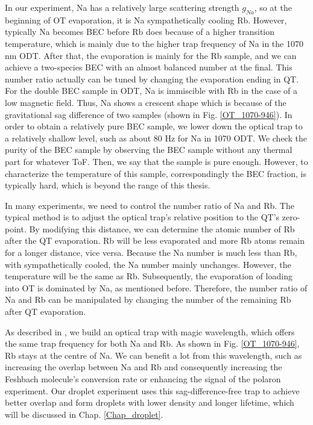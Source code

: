 In our experiment, Na has a relatively large scattering strength $g_{Na}$, so at the beginning of OT evaporation, it is Na sympathetically cooling Rb. However, typically Na becomes BEC before Rb does because of a higher transition temperature, which is mainly due to the higher trap frequency of Na in the 1070 nm ODT. After that, the evaporation is mainly for the Rb sample, and we can achieve a two-species BEC with an almost balanced number at the final. This number ratio actually can be tuned by changing the evaporation ending in QT. For the double BEC sample in ODT, Na is immiscible with Rb in the case of a low magnetic field. Thus, Na shows a crescent shape which is because of the gravitational sag difference of two samples (shown in Fig. \ref{OT_1070-946}). In order to obtain a relatively pure BEC sample, we lower down the optical trap to a relatively shallow level, such as about 80 Hz for Na in 1070 ODT. We check the purity of the BEC sample by observing the BEC sample without any thermal part for whatever ToF. Then, we say that the sample is pure enough. However, to characterize the temperature of this sample, correspondingly the BEC fraction, is typically hard, which is beyond the range of this thesis.

In many experiments, we need to control the number ratio of Na and Rb. The typical method is to adjust the optical trap's relative position to the QT's zero-point. By modifying this distance, we can determine the atomic number of Rb after the QT evaporation. Rb will be less evaporated and more Rb atoms remain for a longer distance, vice versa. Because the Na number is much less than Rb, with sympathetically cooled, the Na number mainly unchanges. However, the temperature will be the same as Rb. Subsequently, the evaporation of loading into OT is dominated by Na, as mentioned before. Therefore, the number ratio of Na and Rb can be manipulated by changing the number of the remaining Rb after QT evaporation.

As described in \cite{LiLintao2021}, we build an optical trap with magic wavelength, which offers the same trap frequency for both Na and Rb. As shown in Fig. \ref{OT_1070-946}, Rb stays at the centre of Na. We can benefit a lot from this wavelength, such as increasing the overlap between Na and Rb and consequently increasing the Feshbach molecule's conversion rate or enhancing the signal of the polaron experiment. Our droplet experiment uses this sag-difference-free trap to achieve better overlap and form droplets with lower density and longer lifetime, which will be discussed in Chap. \ref{Chap_droplet}.

